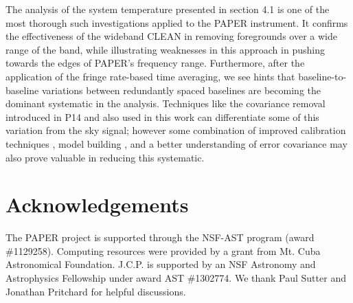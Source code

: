 \documentclass[preprint2]{aastex}
\begin{document}
The analysis of the system temperature presented in section 4.1 is one of the most thorough such investigations applied to the PAPER instrument.  It confirms the effectiveness of the wideband CLEAN in removing foregrounds over a wide range of the band, while illustrating weaknesses in this approach in pushing towards the edges of PAPER's frequency range.  Furthermore, after the application of the fringe rate-based time averaging, we see hints that baseline-to-baseline variations between redundantly spaced baselines are becoming the dominant systematic in the analysis.  Techniques like the covariance removal introduced in P14 and also used in this work can differentiate some of this variation from the sky signal; however some combination of improved calibration techniques \citep{Zheng:2014p10467}, model building \citep{Sullivan:2012p9457}, and a better understanding of error covariance  \citep{Liu:2011p8763} may also prove valuable in reducing this systematic.



\section{Acknowledgements}
The PAPER project is supported through the NSF-AST program (award \#1129258). Computing resources were provided by a grant from Mt. Cuba Astronomical Foundation.  J.C.P. is supported by an NSF Astronomy and Astrophysics Fellowship under award AST \#1302774.   We thank Paul Sutter and Jonathan Pritchard for helpful discussions.




\end{document}
